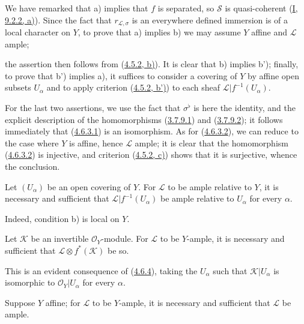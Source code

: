 We have remarked that a) implies that $f$ is separated, so $\mathcal{S}$ is
quasi-coherent (\hyperref[I.9.2.2]{I, 9.2.2, a)}). Since the fact that
$r_{\mathcal{L},\sigma}$ is an everywhere defined immersion is of a
local character on $Y$, to prove that a) implies b) we may assume
$Y$ affine and $\mathcal{L}$ ample;


the assertion then follows from (\hyperref[II.4.5.2]{4.5.2, b)}). It is
clear that b) implies b'); finally, to prove that b') implies a), it
suffices to consider a covering of $Y$ by affine open subsets
$U_\alpha$ and to apply criterion
(\hyperref[II.4.5.2]{4.5.2, b')}) to each sheaf
$\mathcal{L}|f^{-1}(U_\alpha)$.

For the last two assertions, we use the fact that
$\sigma^\flat$ is here the identity, and the explicit description of the homomorphisms
(\hyperref[II.3.7.9.1]{3.7.9.1}) and
(\hyperref[II.3.7.9.2]{3.7.9.2}); it follows immediately that
(\hyperref[II.4.6.3.1]{4.6.3.1}) is an isomorphism. As for
(\hyperref[II.4.6.3.2]{4.6.3.2}), we can reduce to the case where $Y$ is
affine, hence $\mathcal{L}$ ample; it is clear that the homomorphism
(\hyperref[II.4.6.3.2]{4.6.3.2}) is injective, and criterion
(\hyperref[II.4.5.2]{4.5.2, c)}) shows that it is surjective, whence the
conclusion.

\begin{corollary}[4.6.4]
\label{II.4.6.4}
Let $(U_\alpha)$ be an open covering of $Y$. For $\mathcal{L}$
to be ample relative to $Y$, it is necessary and sufficient that
$\mathcal{L}|f^{-1}(U_\alpha)$ be ample relative to $U_\alpha$ for
every $\alpha$.
\end{corollary}

Indeed, condition b) is local on $Y$.

\begin{corollary}[4.6.5]
\label{II.4.6.5}
Let $\mathcal{K}$ be an invertible $\mathcal{O}_Y$-module. For
$\mathcal{L}$ to be $Y$-ample, it is necessary and sufficient that
$\mathcal{L}\otimes f^*(\mathcal{K})$ be so.
\end{corollary}

This is an evident consequence of (\hyperref[II.4.6.4]{4.6.4}),
taking the $U_\alpha$ such that $\mathcal{K}|U_\alpha$ is isomorphic to
$\mathcal{O}_Y|U_\alpha$ for every $\alpha$.

\begin{corollary}[4.6.6]
\label{II.4.6.6}
Suppose $Y$ affine; for $\mathcal{L}$ to be $Y$-ample, it is necessary and
sufficient that $\mathcal{L}$ be ample.
\end{corollary}

